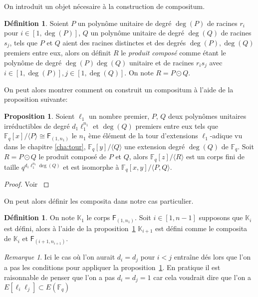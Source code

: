 \documentclass[10pt,a4paper]{book}
\theoremstyle{plain}
\theoremstyle{definition}
\theoremstyle{definition}
\theoremstyle{definition}
\newtheorem{prop}[thm]{Proposition}
\theoremstyle{definition}
\newtheorem{defi}[thm]{Définition}
\theoremstyle{remark}
\newtheorem{rem}[thm]{Remarque}
\theoremstyle{remark}
\theoremstyle{definition}
\begin{document}
On introduit un objet nécesaire à la construction de compositum.
\begin{defi}
Soient $P$ un polynôme unitaire de degré $\deg(P)$ de racines $r_i$ pour 
$i \in [1,\deg(P)]$, $Q$ un polynôme unitaire de degré $\deg(Q)$ de racines 
$s_j$, tels que $P$ et $Q$ aient des racines distinctes et des degrés $\deg(P),
\deg(Q)$ premiers entre eux, alors on définit $R$ le \emph{produit composé} 
comme étant le polynôme de degré $\deg(P)\deg(Q)$ unitaire et de racines 
$r_is_j$ avec $i \in [1,\deg(P)], j \in [1,\deg(Q)]$. On note $R= P\odot Q$.  
\end{defi}
On peut alors montrer comment on construit un compositum à l'aide de la 
proposition suivante: 
\begin{prop}
\label{pro:init:com}
Soient $\ell_1$ un nombre premier, $P$, $Q$ deux 
polynômes unitaires irréductibles de degré $d_1\ell_1^{n_1}$ et $\deg(Q)$ 
premiers entre eux tels que $\mathbb{F}_q[x]/\langle P \rangle \cong 
\mathsf{F}_{(1,n_1)}$ le $n_1$ ème élément de la tour d'extensions 
$\ell_1$-adique vu dans le chapitre \ref{cha:tour}, $\mathbb{F}_q[y]/\langle Q 
\rangle$ une extension degré $\deg(Q)$ de $\mathbb{F}_q$.
 Soit $R=P\odot Q$  le produit composé de $P$ et $Q$, alors 
 $\mathbb{F}_q[z]/\langle R \rangle$ est un corps fini de taille 
 $q^{d_1\ell_1^{n_1}\deg(Q)}$ et est isomorphe à $\mathbb{F}_q[x,y]/
 \langle P,Q \rangle$.
\end{prop}

\begin{proof}
Voir \cite[Theorem 2]{BrawleyCarlitz87}
\end{proof}


On peut alors définir les composita dans notre cas particulier.
\begin{defi}
\label{def:con:com}
On note $\mathbb{K}_1$ le corps $\mathsf{F}_{(1,n_1)}$. Soit $i \in [1,n-1]$ 
supposons que $\mathbb{K}_{i}$ est défini, alors à 
l'aide de la proposition~\ref{pro:init:com} $\mathbb{K}_{i+1}$ est défini comme
 le composita de $\mathbb{K}_i$ et $\mathsf{F}_{(i+1,n_{i+1})}$.
\end{defi}
\begin{rem}
Ici le cas où l'on aurait $d_i=d_j$ pour $i<j$ entraîne dés lors que l'on a pas
les conditions pour appliquer la proposition~\ref{pro:init:com}.  
En pratique il est raisonnable de penser que l'on a pas $d_i=d_j=1$ car cela 
voudrait dire que l'on a $E[\ell_i \ell_j] \subset E(\mathbb{F}_q)$ 
\end{rem}
\end{document}
